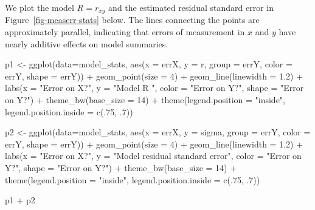 \documentclass[
  letterpaper,
  10pt,
  krantz2]{krantz}
\makeatletter
\newenvironment{Shaded}{\begin{snugshade}}{\end{snugshade}}
\newcommand{\AttributeTok}[1]{\textcolor[rgb]{0.40,0.45,0.13}{#1}}
\newcommand{\DecValTok}[1]{\textcolor[rgb]{0.68,0.00,0.00}{#1}}
\newcommand{\FloatTok}[1]{\textcolor[rgb]{0.68,0.00,0.00}{#1}}
\newcommand{\FunctionTok}[1]{\textcolor[rgb]{0.28,0.35,0.67}{#1}}
\newcommand{\NormalTok}[1]{\textcolor[rgb]{0.00,0.23,0.31}{#1}}
\newcommand{\OtherTok}[1]{\textcolor[rgb]{0.00,0.23,0.31}{#1}}
\newcommand{\SpecialCharTok}[1]{\textcolor[rgb]{0.37,0.37,0.37}{#1}}
\newcommand{\StringTok}[1]{\textcolor[rgb]{0.13,0.47,0.30}{#1}}
\newenvironment{kframe}{%
  \medskip{}
  \setlength{\fboxsep}{.8em}
  \def\at@end@of@kframe{}%
  \ifinner\ifhmode%
  \def\at@end@of@kframe{\end{minipage}}%
  \begin{minipage}{\columnwidth}%
  \fi\fi%
  \def\FrameCommand##1{\hskip\@totalleftmargin \hskip-\fboxsep
  \colorbox{shadecolor}{##1}\hskip-\fboxsep
      \hskip-\linewidth \hskip-\@totalleftmargin \hskip\columnwidth}%
  \MakeFramed {\advance\hsize-\width
    \@totalleftmargin\z@ \linewidth\hsize
    \@setminipage}}%
{\par\unskip\endMakeFramed%
  \at@end@of@kframe}
\renewenvironment{Shaded}{\begin{kframe}}{\end{kframe}}
\makeatother
\begin{document}
We plot the model \(R = r_{xy}\) and the estimated residual standard
error in Figure~\ref{fig-measerr-stats} below. The lines connecting the
points are approximately parallel, indicating that errors of measurement
in \(x\) and \(y\) have nearly additive effects on model summaries.

\begin{Shaded}
\begin{Highlighting}[]
\NormalTok{p1 }\OtherTok{\textless{}{-}} \FunctionTok{ggplot}\NormalTok{(}\AttributeTok{data=}\NormalTok{model\_stats, }
             \FunctionTok{aes}\NormalTok{(}\AttributeTok{x =}\NormalTok{ errX, }\AttributeTok{y =}\NormalTok{ r, }
                 \AttributeTok{group =}\NormalTok{ errY, }\AttributeTok{color =}\NormalTok{ errY, }\AttributeTok{shape =}\NormalTok{ errY)) }\SpecialCharTok{+}
  \FunctionTok{geom\_point}\NormalTok{(}\AttributeTok{size =} \DecValTok{4}\NormalTok{) }\SpecialCharTok{+}
  \FunctionTok{geom\_line}\NormalTok{(}\AttributeTok{linewidth =} \FloatTok{1.2}\NormalTok{) }\SpecialCharTok{+}
  \FunctionTok{labs}\NormalTok{(}\AttributeTok{x =} \StringTok{"Error on X?"}\NormalTok{,}
       \AttributeTok{y =} \StringTok{"Model R "}\NormalTok{,}
       \AttributeTok{color =} \StringTok{"Error on Y?"}\NormalTok{,}
       \AttributeTok{shape =} \StringTok{"Error on Y?"}\NormalTok{) }\SpecialCharTok{+}
  \FunctionTok{theme\_bw}\NormalTok{(}\AttributeTok{base\_size =} \DecValTok{14}\NormalTok{) }\SpecialCharTok{+}
  \FunctionTok{theme}\NormalTok{(}\AttributeTok{legend.position =} \StringTok{"inside"}\NormalTok{,}
        \AttributeTok{legend.position.inside =} \FunctionTok{c}\NormalTok{(.}\DecValTok{75}\NormalTok{, .}\DecValTok{7}\NormalTok{))}

\NormalTok{p2 }\OtherTok{\textless{}{-}} \FunctionTok{ggplot}\NormalTok{(}\AttributeTok{data=}\NormalTok{model\_stats, }
             \FunctionTok{aes}\NormalTok{(}\AttributeTok{x =}\NormalTok{ errX, }\AttributeTok{y =}\NormalTok{ sigma, }
                 \AttributeTok{group =}\NormalTok{ errY, }\AttributeTok{color =}\NormalTok{ errY, }\AttributeTok{shape =}\NormalTok{ errY)) }\SpecialCharTok{+}
  \FunctionTok{geom\_point}\NormalTok{(}\AttributeTok{size =} \DecValTok{4}\NormalTok{) }\SpecialCharTok{+}
  \FunctionTok{geom\_line}\NormalTok{(}\AttributeTok{linewidth =} \FloatTok{1.2}\NormalTok{) }\SpecialCharTok{+}
  \FunctionTok{labs}\NormalTok{(}\AttributeTok{x =} \StringTok{"Error on X?"}\NormalTok{,}
     \AttributeTok{y =} \StringTok{"Model residual standard error"}\NormalTok{,}
     \AttributeTok{color =} \StringTok{"Error on Y?"}\NormalTok{,}
     \AttributeTok{shape =} \StringTok{"Error on Y?"}\NormalTok{) }\SpecialCharTok{+}
  \FunctionTok{theme\_bw}\NormalTok{(}\AttributeTok{base\_size =} \DecValTok{14}\NormalTok{) }\SpecialCharTok{+}
  \FunctionTok{theme}\NormalTok{(}\AttributeTok{legend.position =} \StringTok{"inside"}\NormalTok{,}
        \AttributeTok{legend.position.inside =} \FunctionTok{c}\NormalTok{(.}\DecValTok{75}\NormalTok{, .}\DecValTok{7}\NormalTok{))}

\NormalTok{p1 }\SpecialCharTok{+}\NormalTok{ p2}
\end{Highlighting}
\end{Shaded}
\end{document}
